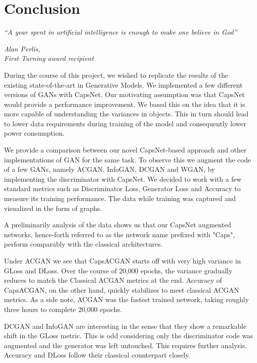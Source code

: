 \chapter{Conclusion}\label{ch:conclusion}
\epigraph{\textit{\normalsize “A year spent in artificial intelligence is enough to make one believe in God”}}{\textit{ \normalsize Alan Perlis,\\ First Turning award recipient}}

During the course of this project, we wished to replicate the results of the existing state-of-the-art in Generative Models. We implemented a few different versions of GANs with CapsNet. Our motivating assumption was that CapsNet would provide a performance improvement. We based this on the idea that it is more capable of understanding the variances in objects. This in turn should lead to lower data requirements during training of the model and consequently lower power consumption. 
\par\bigskip 

We provide a comparison between our novel CapsNet-based approach and other implementations of GAN for the same task. To observe this we augment the code of a few GANs, namely ACGAN, InfoGAN, DCGAN and WGAN, by implementing the discriminator with CapsNet. We decided to work with a few standard metrics such as Discriminator Loss, Generator Loss and Accuracy to measure its training performance. The data while training was captured and visualized in the form of graphs.
\par\bigskip 

A preliminarily analysis of the data shows us that our CapsNet augmented networks, hence-forth referred to as the network name prefixed with "Caps", perform comparably with the classical architectures. 
\par\bigskip

Under ACGAN we see that CapsACGAN starts off with very high variance in GLoss and DLoss. Over the course of 20,000 epochs, the variance gradually reduces to match the Classical ACGAN metrics at the end. Accuracy of CapsACGAN, on the other hand, quickly stabilizes to meet classical ACGAN metrics. As a side note, ACGAN was the fastest trained network, taking roughly three hours to complete 20,000 epochs.
\par\bigskip

DCGAN and InfoGAN are interesting in the sense that they show a remarkable shift in the GLoss metric. This is odd considering only the discriminator code was augmented and the generator was left untouched. This requires further analysis. Accuracy and DLoss follow their classical counterpart closely.
\par\bigskip

